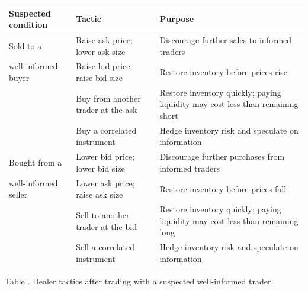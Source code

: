 \begin{table}[htbp]
\centering
\scriptsize
{}
\renewcommand{\arraystretch}{1.13}
\setlength{\tabcolsep}{4pt}
\begin{tabularx}{\textwidth}{@{}>{\RaggedRight\arraybackslash}p{} >{\RaggedRight\arraybackslash}p{} >{\RaggedRight\arraybackslash}X@{}}
\hline
\textbf{Suspected condition} & \textbf{Tactic} & \textbf{Purpose} \\
\hline
Sold to a & Raise ask price; lower ask size & Discourage further sales to informed traders \\
well-informed buyer & Raise bid price; raise bid size & Restore inventory before prices rise \\
& Buy from another trader at the ask & Restore inventory quickly; paying liquidity may cost less than remaining short \\
& Buy a correlated instrument & Hedge inventory risk and speculate on information \\
\hline
Bought from a & Lower bid price; lower bid size & Discourage further purchases from informed traders \\
well-informed seller & Lower ask price; raise ask size & Restore inventory before prices fall \\
& Sell to another trader at the bid & Restore inventory quickly; paying liquidity may cost less than remaining long \\
& Sell a correlated instrument & Hedge inventory risk and speculate on information \\
\hline
\end{tabularx}

\vspace{0.25em}
{\footnotesize Table \thetable. Dealer tactics after trading with a suspected well-informed trader.}
\end{table}

